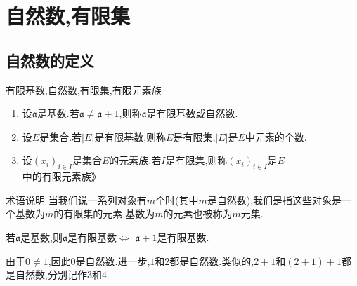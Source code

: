 \chapter{自然数,有限集}

\section{自然数的定义}

\begin{definition}{有限基数,自然数,有限集,有限元素族}{}
	\begin{enumerate}
		\item 设$\mathfrak{a}$是基数.若$\mathfrak{a}\neq\mathfrak{a}+1$,则称$\mathfrak{a}$是有限基数或自然数.
		\item 设$E$是集合.若$\left|E\right|$是有限基数,则称$E$是有限集,$\left|E\right|$是$E$中元素的个数.
		\item 设$\left(x_{i}\right)_{i\in I}$是集合$E$的元素族.若$I$是有限集,则称$\left(x_{i}\right)_{i\in I}$是$E$中的有限元素族》
	\end{enumerate}
\end{definition}

\begin{remark}{术语说明}{}
	当我们说一系列对象有$m$个时(其中$m$是自然数),我们是指这些对象是一个基数为$m$的有限集的元素.基数为$m$的元素也被称为$m$元集.
\end{remark}

\begin{proposition}{}{}
	若$\mathfrak{a}$是基数,则$\mathfrak{a}$是有限基数$\iff$ $\mathfrak{a}+1$是有限基数.
\end{proposition}

\begin{remark}{}{}
	由于$0\neq 1$,因此$0$是自然数.进一步,$1$和$2$都是自然数.类似的,$2+1$和$\left(2+1\right)+1$都是自然数,分别记作$3$和$4$.
\end{remark}



















